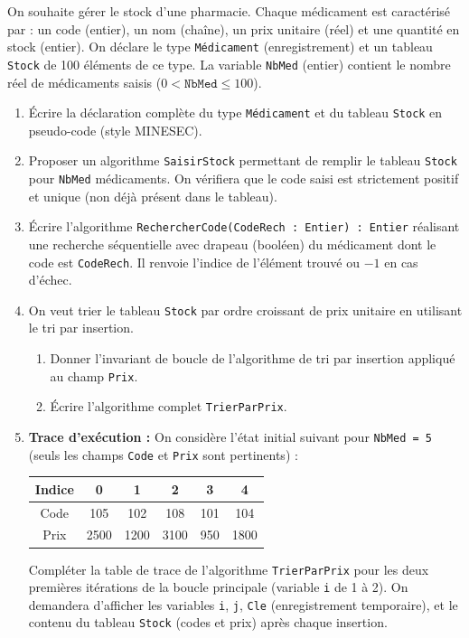 \documentclass[11pt]{article}
\begin{document}
\begin{exercice}
On souhaite gérer le stock d'une pharmacie. Chaque médicament est caractérisé par : un code (entier), un nom (chaîne), un prix unitaire (réel) et une quantité en stock (entier). 
On déclare le type \texttt{Médicament} (enregistrement) et un tableau \texttt{Stock} de 100 éléments de ce type. La variable \texttt{NbMed} (entier) contient le nombre réel de médicaments saisis ($0 < \texttt{NbMed} \le 100$).

\begin{enumerate}
    \item Écrire la déclaration complète du type \texttt{Médicament} et du tableau \texttt{Stock} en pseudo-code (style MINESEC).
    \item Proposer un algorithme \texttt{SaisirStock} permettant de remplir le tableau \texttt{Stock} pour \texttt{NbMed} médicaments. On vérifiera que le code saisi est strictement positif et unique (non déjà présent dans le tableau).
    \item Écrire l'algorithme \texttt{RechercherCode(CodeRech : Entier) : Entier} réalisant une recherche séquentielle avec drapeau (booléen) du médicament dont le code est \texttt{CodeRech}. Il renvoie l'indice de l'élément trouvé ou $-1$ en cas d'échec.
    \item On veut trier le tableau \texttt{Stock} par ordre croissant de prix unitaire en utilisant le tri par insertion. 
    \begin{enumerate}
        \item Donner l'invariant de boucle de l'algorithme de tri par insertion appliqué au champ \texttt{Prix}.
        \item Écrire l'algorithme complet \texttt{TrierParPrix}.
    \end{enumerate}
    \item \textbf{Trace d'exécution :} On considère l'état initial suivant pour \texttt{NbMed = 5} (seuls les champs \texttt{Code} et \texttt{Prix} sont pertinents) :
    \begin{center}
    \begin{tabular}{|c|c|c|c|c|c|}
    \hline Indice & 0 & 1 & 2 & 3 & 4 \\ \hline
    Code & 105 & 102 & 108 & 101 & 104 \\ \hline
    Prix & 2500 & 1200 & 3100 & 950 & 1800 \\ \hline
    \end{tabular}
    \end{center}
    Compléter la table de trace de l'algorithme \texttt{TrierParPrix} pour les deux premières itérations de la boucle principale (variable \texttt{i} de 1 à 2). On demandera d'afficher les variables \texttt{i}, \texttt{j}, \texttt{Cle} (enregistrement temporaire), et le contenu du tableau \texttt{Stock} (codes et prix) après chaque insertion.
\end{enumerate}
\end{exercice}
\end{document}

